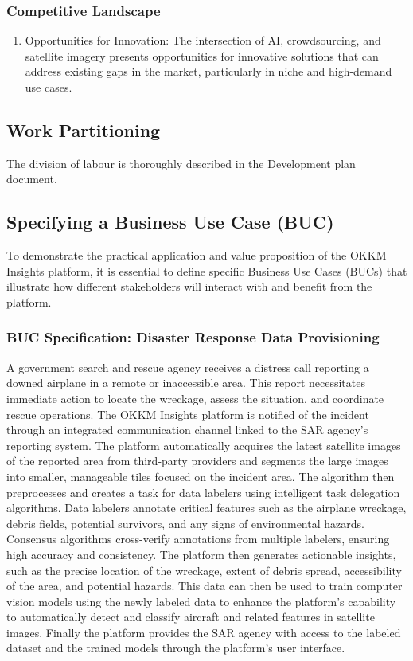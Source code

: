 \documentclass[12pt]{article}
\begin{document}
\subsubsection{Competitive Landscape}
\begin{enumerate}
    \item Opportunities for Innovation: The intersection of AI, crowdsourcing, and satellite imagery presents opportunities for innovative solutions that can address existing gaps in the market, particularly in niche and high-demand use cases.
\end{enumerate}
\subsection{Work Partitioning}
The division of labour is thoroughly described in the Development plan document.
\subsection{Specifying a Business Use Case (BUC)}
To demonstrate the practical application and value proposition of the OKKM Insights platform, it is essential to define specific Business Use Cases (BUCs) that illustrate how different stakeholders will interact with and benefit from the platform.
\subsubsection{BUC Specification: Disaster Response Data Provisioning}
A government search and rescue agency receives a distress call reporting a downed airplane in a remote or inaccessible area. This report necessitates immediate action to locate the wreckage, assess the situation, and coordinate rescue operations. The OKKM Insights platform is notified of the incident through an integrated communication channel linked to the SAR agency’s reporting system. The platform automatically acquires the latest satellite images of the reported area from third-party providers and segments the large images into smaller, manageable tiles focused on the incident area. The algorithm then preprocesses and creates a task for data labelers using intelligent task delegation algorithms. Data labelers annotate critical features such as the airplane wreckage, debris fields, potential survivors, and any signs of environmental hazards. Consensus algorithms cross-verify annotations from multiple labelers, ensuring high accuracy and consistency. The platform then generates actionable insights, such as the precise location of the wreckage, extent of debris spread, accessibility of the area, and potential hazards. This data can then be used to train computer vision models using the newly labeled data to enhance the platform’s capability to automatically detect and classify aircraft and related features in satellite images. Finally the platform provides the SAR agency with access to the labeled dataset and the trained models through the platform’s user interface.
\newpage
\end{document}
